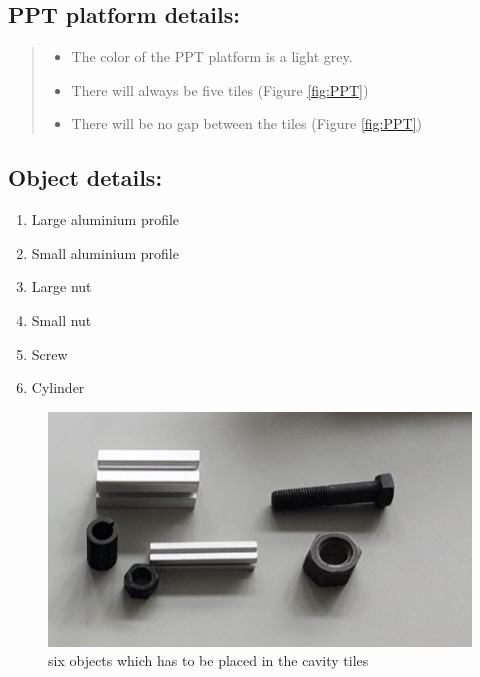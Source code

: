 \documentclass{article}
\begin{document}
\subsection{PPT platform details: }

\begin{quote}
\begin{itemize}
\item The color of the PPT platform is a light grey.
\item There will always be five tiles (Figure \ref{fig:PPT}) 
\item There will be no gap between the tiles (Figure \ref{fig:PPT})
\end{itemize}
\end{quote}




\subsection{Object details:}

\begin{enumerate}
\item Large aluminium profile
\item Small aluminium profile
\item Large nut
\item Small nut
\item Screw
\item Cylinder 
\end{enumerate}

\begin{figure}[h!]
\begin{center}
\includegraphics[scale=0.5]{images/AllParts.jpg}
\end{center}
\caption{six objects which has to be placed in the cavity tiles \cite{second} }
\end{figure}
\end{document}
